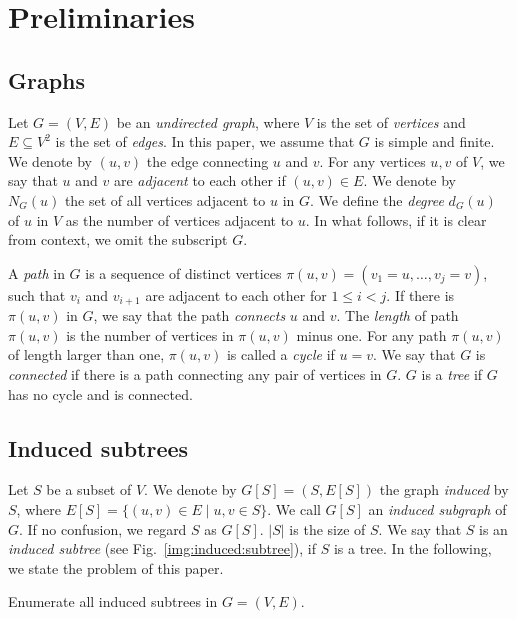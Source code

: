 \documentclass{llncs}
\newcommand{\name}[1]{\textit{#1}}
\newcommand{\inset}[2]{\{#1\;|\;#2\}}
\begin{document}
\section{Preliminaries}
\label{sec:prelim}

\subsection{Graphs}

Let $G=(V, E)$ be an \name{undirected graph}, 
where $V$ is the set of \name{vertices} and $E \subseteq V^2$ is the set of \name{edges}. 
In this paper, we assume that $G$ is simple and finite. 
We denote by $(u, v)$ the edge connecting $u$ and $v$. 
For any vertices $u, v$ of $V$, 
we say that $u$ and $v$ are \name{adjacent} to each other if $(u, v) \in E$.  
We denote by $N_G(u)$ the set of all vertices adjacent to $u$ in $G$. 
We define the \name{degree} $d_G(u)$ of $u$ in $V$ as the number of vertices adjacent to $u$. 
In what follows,
if it is clear from context, 
we omit the subscript $G$. 

A \name{path} in $G$ is 
a sequence of distinct vertices $\pi(u, v) = (v_1 = u, \dots, v_j = v)$, 
such that $v_i$ and $v_{i+1}$ are adjacent to each other for $1 \le i < j$. 
If there is $\pi(u, v)$ in $G$, 
we say that the path \name{connects} $u$ and $v$. 
The \name{length} of path $\pi(u, v)$ is the number of vertices in $\pi(u, v)$ minus one. 
For any path $\pi(u, v)$ of length larger than one, 
$\pi(u, v)$ is called a \name{cycle} if $u = v$. 
We say that $G$ is \name{connected} 
if there is a path connecting any pair of vertices in $G$. 
$G$ is a \name{tree} if $G$ has no cycle and is connected. 


\subsection{Induced subtrees}

Let $S$ be a subset of $V$. 
We denote by $G[S] = (S, E[S])$ the graph \name{induced} by $S$, 
where $E[S] = \inset{(u, v) \in E}{u, v \in S}$. 
We call $G[S]$ an \name{induced subgraph} of $G$. 
If no confusion, we regard $S$ as $G[S]$.
$|S|$ is the size of $S$. 
We say that $S$ is an \name{induced subtree} (see Fig.~\ref{img:induced:subtree}),  
if $S$ is a tree.  
In the following, we state the problem of this paper. 

\begin{wproblem}
    \label{prob:main}
    Enumerate all induced subtrees in  $G = (V, E)$. 
\end{wproblem}
\end{document}
